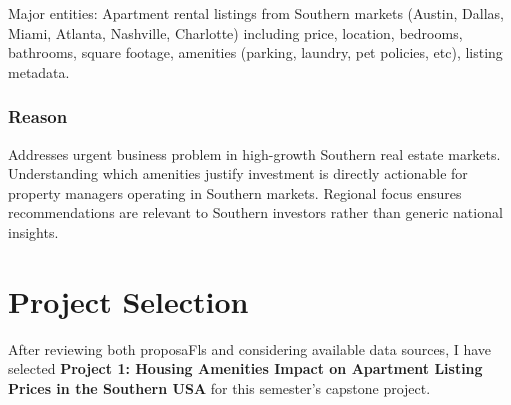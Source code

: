 Major entities: Apartment rental listings from Southern markets (Austin, Dallas, Miami, Atlanta, Nashville, Charlotte) including %
price, location, bedrooms, bathrooms, square footage, amenities (parking, laundry, pet policies, etc), listing metadata. %

\subsubsection*{Reason}

Addresses urgent business problem in high-growth Southern real estate markets. Understanding which amenities justify investment is directly actionable for property managers operating in Southern markets. Regional focus ensures recommendations are relevant to Southern investors rather than generic national insights. %


\section*{Project Selection}

After reviewing both proposaFls and considering available data sources, I have selected \textbf{Project 1: Housing Amenities Impact on Apartment Listing Prices in the Southern USA} for this semester's capstone project.

